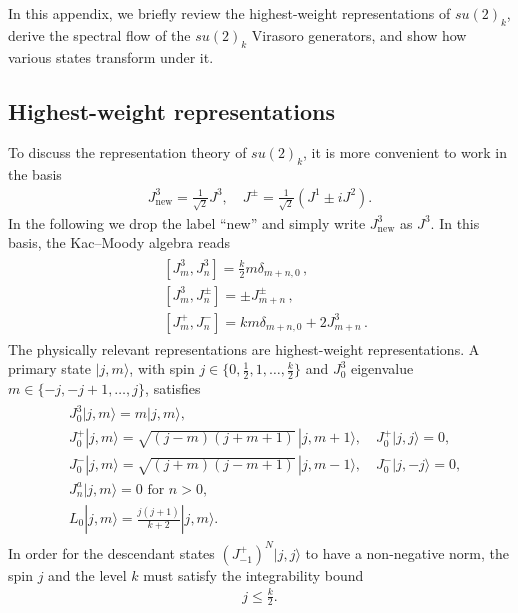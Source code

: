 \documentclass[11pt]{article}
\numberwithin{equation}{section}
\begin{document}
In this appendix, we briefly review the highest-weight representations of $su(2)_k$, derive the spectral flow of the $su(2)_k$ Virasoro generators, and show how various states transform under it. 

\subsection{Highest-weight representations}
\label{HWR_su(2)}

 To discuss the representation theory of $su(2)_k$,  it is more convenient to work in the basis
 \begin{align}
     J^3_{\text{new}}=\frac{1}{\sqrt{2}}J^3, \quad J^{\pm}=\frac{1}{\sqrt{2}}(J^1\pm i J^2).
     \label{equ:SU(2)_new_basis}
 \end{align}
In the following we drop the label ``new'' and simply write $J^3_{\text{new}}$ as $J^3$. In this basis, the Kac--Moody algebra reads
\begin{align}
\begin{split}
    &[J^3_m,J^3_n]=\frac{k}{2}m \delta_{m+n,0}\,, \\
    &[J^3_m,J^{\pm}_{n}]=\pm J^{\pm}_{m+n}\,, \\
    &[J^+_m,J^-_n]=km\delta_{m+n,0}+2J^3_{m+n}\,.
\end{split}
\end{align}
The physically relevant representations are highest-weight representations. A primary state $|j,m\rangle$, with spin $j\in \{0, \frac12,1,\dots,\frac k2\}$ and $J^3_0$ eigenvalue $m\in \{-j, -j+1,\dots,j\}$, satisfies
\begin{align} 
\begin{split}
    &J_0^{3} |j,m\rangle=m|j,m\rangle, \\
    & J^+_0|j,m\rangle= 
    \sqrt{(j-m)(j+m+1)}\,|j,m+1\rangle, \quad  J^+_0|j,j\rangle= 0, \\
    & J^-_0|j,m\rangle=  \sqrt{(j+m)(j-m+1)}\,|j,m-1\rangle, \quad  J^-_0|j,-j\rangle= 0, \\
    &J^a_n|j,m\rangle=0 \text{ for $n>0$}, \\
    &L_0|j,m\rangle=\frac{j(j+1)}{k+2}|j,m\rangle.
\end{split}
\end{align}
In order for the descendant states $(J_{-1}^+)^N |j,j\rangle$ to have a non-negative norm, the spin $j$ and the level $k$ must satisfy the integrability bound
\begin{align}
j\leq \frac{k}{2}.
\end{align}
\end{document}
